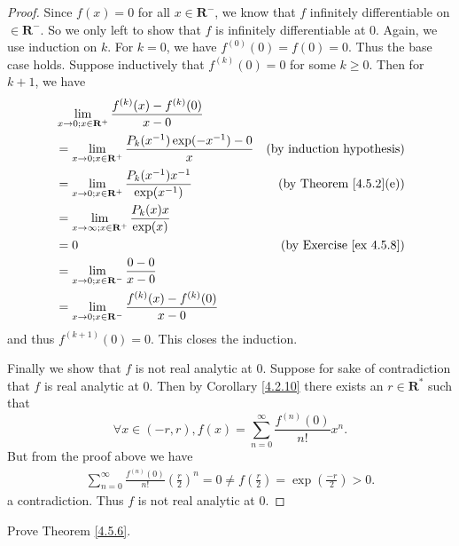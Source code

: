 \begin{proof}
    Since \(f(x) = 0\) for all \(x \in \mathbf{R}^-\), we know that \(f\) infinitely differentiable on \(\in \mathbf{R}^-\).
    So we only left to show that \(f\) is infinitely differentiable at \(0\).
    Again, we use induction on \(k\).
    For \(k = 0\), we have \(f^{(0)}(0) = f(0) = 0\).
    Thus the base case holds.
    Suppose inductively that \(f^{(k)}(0) = 0\) for some \(k \geq 0\).
    Then for \(k + 1\), we have
    \begin{align*}
         & \lim_{x \to 0 ; x \in \mathbf{R}^+} \frac{f^{(k)}(x) - f^{(k)}(0)}{x - 0}                                           \\
         & = \lim_{x \to 0 ; x \in \mathbf{R}^+} \frac{P_k(x^{-1}) \exp(-x^{-1}) - 0}{x} & \text{(by induction hypothesis)}    \\
         & = \lim_{x \to 0 ; x \in \mathbf{R}^+} \frac{P_k(x^{-1}) x^{-1}}{\exp(x^{-1})} & \text{(by Theorem \ref{4.5.2}(e))}  \\
         & = \lim_{x \to \infty ; x \in \mathbf{R}^+} \frac{P_k(x) x}{\exp(x)}                                                 \\
         & = 0                                                                           & \text{(by Exercise \ref{ex 4.5.8})} \\
         & = \lim_{x \to 0 ; x \in \mathbf{R}^-} \frac{0 - 0}{x - 0}                                                           \\
         & = \lim_{x \to 0 ; x \in \mathbf{R}^-} \frac{f^{(k)}(x) - f^{(k)}(0)}{x - 0}
    \end{align*}
    and thus \(f^{(k + 1)}(0) = 0\).
    This closes the induction.

    Finally we show that \(f\) is not real analytic at \(0\).
    Suppose for sake of contradiction that \(f\) is real analytic at \(0\).
    Then by Corollary \ref{4.2.10} there exists an \(r \in \mathbf{R}^*\) such that
    \[
        \forall x \in (-r, r), f(x) = \sum_{n = 0}^\infty \frac{f^{(n)}(0)}{n!} x^n.
    \]
    But from the proof above we have
    \begin{align*}
        \sum_{n = 0}^\infty \frac{f^{(n)}(0)}{n!} (\frac{r}{2})^n = 0 \neq f(\frac{r}{2}) = \exp(\frac{-r}{2}) > 0.
    \end{align*}
    a contradiction.
    Thus \(f\) is not real analytic at \(0\).
\end{proof}

\begin{exercise}\label{ex 4.5.5}
    Prove Theorem \ref{4.5.6}.
\end{exercise}

